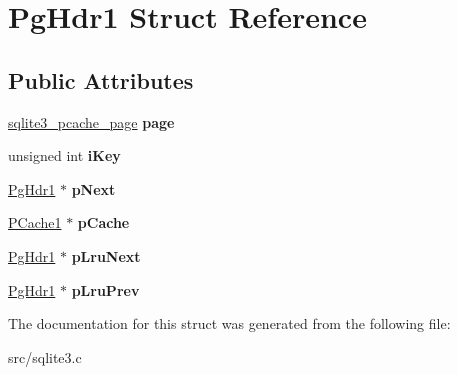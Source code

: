 \hypertarget{struct_pg_hdr1}{\section{Pg\-Hdr1 Struct Reference}
\label{struct_pg_hdr1}
}
\subsection*{Public Attributes}
\begin{DoxyCompactItemize}
\item 
\hypertarget{struct_pg_hdr1_a121a9abbfea6b112ba77eeb84391ed47}{\hyperlink{structsqlite3__pcache__page}{sqlite3\-\_\-pcache\-\_\-page} {\bfseries page}}\label{struct_pg_hdr1_a121a9abbfea6b112ba77eeb84391ed47}

\item 
\hypertarget{struct_pg_hdr1_ad122ef74f5f0137414882aabd111a01b}{unsigned int {\bfseries i\-Key}}\label{struct_pg_hdr1_ad122ef74f5f0137414882aabd111a01b}

\item 
\hypertarget{struct_pg_hdr1_acde43ab0ed0fbba33e526058d9c343b9}{\hyperlink{struct_pg_hdr1}{Pg\-Hdr1} $\ast$ {\bfseries p\-Next}}\label{struct_pg_hdr1_acde43ab0ed0fbba33e526058d9c343b9}

\item 
\hypertarget{struct_pg_hdr1_aa5b23de466773e72e1b6edf07b3a4570}{\hyperlink{struct_p_cache1}{P\-Cache1} $\ast$ {\bfseries p\-Cache}}\label{struct_pg_hdr1_aa5b23de466773e72e1b6edf07b3a4570}

\item 
\hypertarget{struct_pg_hdr1_ae22cfc3a39fe029a8f8fdd70e7ca4055}{\hyperlink{struct_pg_hdr1}{Pg\-Hdr1} $\ast$ {\bfseries p\-Lru\-Next}}\label{struct_pg_hdr1_ae22cfc3a39fe029a8f8fdd70e7ca4055}

\item 
\hypertarget{struct_pg_hdr1_adf220ef63d6ceb782ac87a08aeb1722d}{\hyperlink{struct_pg_hdr1}{Pg\-Hdr1} $\ast$ {\bfseries p\-Lru\-Prev}}\label{struct_pg_hdr1_adf220ef63d6ceb782ac87a08aeb1722d}

\end{DoxyCompactItemize}


The documentation for this struct was generated from the following file\-:\begin{DoxyCompactItemize}
\item 
src/sqlite3.\-c\end{DoxyCompactItemize}
